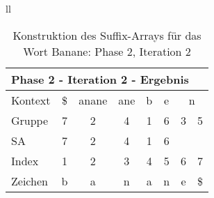 \begin{table}[H]
\begin{adjustbox}{max width=\textwidth}
\begin{tabular}{ll}
\begin{tabular}{lccccccc}
\multicolumn{8}{l}{Phase 2 - Iteration 2 - Ergebnis}                                                                                                                                                             \\ \hline
\multicolumn{1}{l|}{Kontext} & \multicolumn{1}{c|}{\$} & \multicolumn{1}{c|}{anane} & \multicolumn{1}{c|}{ane} & \multicolumn{1}{c|}{b}                         & \multicolumn{1}{c|}{e} & \multicolumn{2}{c}{n} \\
\multicolumn{1}{l|}{Gruppe}  & \multicolumn{1}{c|}{7}  & \multicolumn{1}{c|}{2}     & \multicolumn{1}{c|}{4}   & \multicolumn{1}{c|}{1}                         & \multicolumn{1}{c|}{6} & 3         & 5          \\ 
\multicolumn{1}{l|}{SA}      & \multicolumn{1}{c|}{7}    & \multicolumn{1}{c|}{2}     & \multicolumn{1}{c|}{4}   &  \multicolumn{1}{c|}{\cellcolor[HTML]{\yellow}1}   & \multicolumn{1}{c|}{6} &           &            \\ \hline
\multicolumn{1}{l|}{Index}   & 1                       & 2                          & 3                        & 4                                              & 5                      & 6         & 7          \\
\multicolumn{1}{l|}{Zeichen} & b                       & a                          & n                        & a                                              & n                      & e         & \$        
\end{tabular}

\end{tabular}
\end{adjustbox}

\caption[Konstruktion des Suffix-Arrays für das Wort Banane: Phase 2, Iteration 2]{Konstruktion des Suffix-Arrays für das Wort Banane: Phase 2, Iteration 2}
\label{fig_banane_2_2} 
\end{table}
